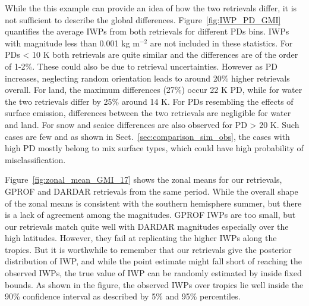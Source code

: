 \documentclass[amt, manuscript]{copernicus}
\begin{document}

While the this example can provide an idea of how the two retrievals differ, it is not sufficient to describe the global differences. Figure~\ref{fig:IWP_PD_GMI} quantifies the average IWPs from both retrievals for different PDs bins. IWPs with magnitude less than 0.001\,\,kg m$^{-2}$ are not included in these statistics. For PDs < 10\,\,K both retrievals are quite similar and the differences are of the order of 1-2\%. These could also be due to retrieval uncertainties. However as PD increases, neglecting random orientation leads to around 20\% higher retrievals overall. For land, the maximum differences (27\%) occur 22\,\,K PD, while for water the two retrievals differ by 25\% around 14\,\,K. For PDs resembling the effects of surface emission, differences between the two retrievals are negligible for water and land. For snow and seaice differences are also observed for PD > 20\,\,K.  Such cases are few and as shown in Sect.~\ref{sec:comparison_sim_obs}, the cases with high PD mostly belong to mix surface types, which could have high probability of misclassification.


Figure~\ref{fig:zonal_mean_GMI_17} shows the zonal means for our retrievals, GPROF and DARDAR retrievals from the same period. While the overall shape of the zonal means is consistent with the southern hemisphere summer, but there is a lack of agreement among the magnitudes. GPROF IWPs are too small, but our retrievals match quite well with DARDAR magnitudes especially over the high latitudes. However, they fail at replicating the higher IWPs along the tropics. But it is worthwhile to remember that our retrievals give the posterior distribution of IWP, and while the point estimate might fall short of reaching the observed IWPs, the true value of IWP can be randomly estimated by inside fixed bounds. As shown in the figure, the observed IWPs over tropics lie well inside the 90\% confidence interval as described by 5\% and 95\% percentiles.
  
\end{document}
